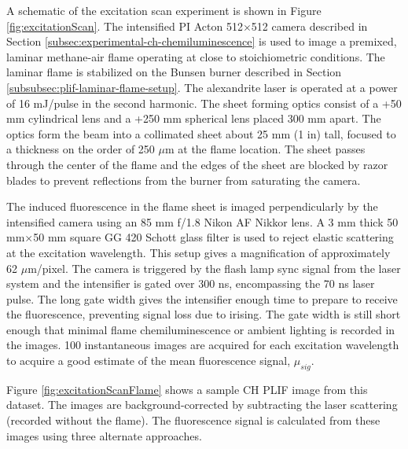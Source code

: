 
A schematic of the excitation scan experiment is shown in Figure \ref{fig:excitationScan}.
The intensified PI Acton 512\(\times\)512 camera described in Section \ref{subsec:experimental-ch-chemiluminescence} is used to image a premixed, laminar methane-air flame operating at close to stoichiometric conditions.
The laminar flame is stabilized on the Bunsen burner described in Section \ref{subsubsec:plif-laminar-flame-setup}.
The alexandrite laser is operated at a power of 16 mJ/pulse in the second harmonic.
The sheet forming optics consist of a +50 mm cylindrical lens and a +250 mm spherical lens placed 300 mm apart.
The optics form the beam into a collimated sheet about 25 mm (1 in) tall, focused to a thickness on the order of 250 \(\mu\)m at the flame location.
The sheet passes through the center of the flame and the edges of the sheet are blocked by razor blades to prevent reflections from the burner from saturating the camera.



The induced fluorescence in the flame sheet is imaged perpendicularly by the intensified camera using an 85 mm f/1.8 Nikon AF Nikkor lens.
A 3 mm thick 50 mm\(\times\)50 mm square GG 420 Schott glass filter is used to reject elastic scattering at the excitation wavelength.
This setup gives a magnification of approximately 62 \(\mu\)m/pixel.
The camera is triggered by the flash lamp sync signal from the laser system and the intensifier is gated over 300 ns, encompassing the 70 ns laser pulse.
The long gate width gives the intensifier enough time to prepare to receive the fluorescence, preventing signal loss due to irising.
The gate width is still short enough that minimal flame chemiluminescence or ambient lighting is recorded in the images.
100 instantaneous images are acquired for each excitation wavelength to acquire a good estimate of the mean fluorescence signal, \(\mu_{sig}\).


Figure \ref{fig:excitationScanFlame} shows a sample CH PLIF image from this dataset.
The images are background-corrected by subtracting the laser scattering (recorded without the flame).
The fluorescence signal is calculated from these images using three alternate approaches.



